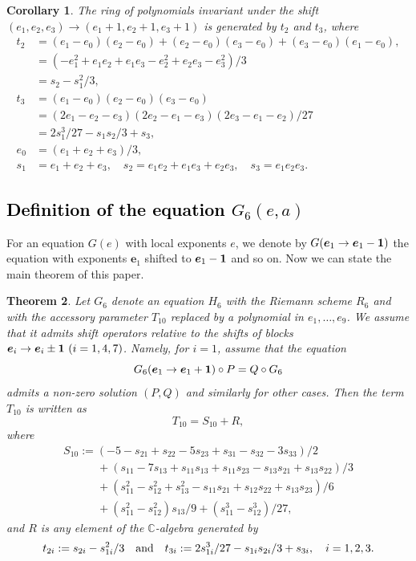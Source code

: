 \documentclass[a4paper,12pt]{article}
\newtheorem{thm}{Theorem}[section]  %
\newtheorem{cor}[thm]{Corollary}
\theoremstyle{definition}
\theoremstyle{remark}
\numberwithin{equation}{section} %
\newcommand{\blue}[1]{\textcolor{black}{#1}}
\begin{document}
\begin{cor}\label{t2t3}The ring of polynomials invariant under the shift $(e_1,e_2,e_3)\to(e_1+1,e_2+1,e_3+1)$ is generated by $t_2$ and $t_3$, where
\[
\begin{array}{ll}
    t_2&=(e_1-e_0)(e_2-e_0)+(e_2-e_0)(e_3-e_0)+(e_3-e_0)(e_1-e_0),\\
    &=(-e_1^2 + e_1e_2 + e_1e_3 - e_2^2 + e_2e_3 - e_3^2)/3\\
    &=s_2-s_1^2/3,\\[2mm]
    t_3&=(e_1 - e_0)(e_2 - e_0)(e_3 - e_0)\\
    &=(2e_1 - e_2 - e_3)(2e_2 - e_1 - e_3)(2e_3 - e_1 - e_2)/27\\
    &=2s_1^3/27 - s_1s_2/3 + s_3,    \\
    e_0&=(e_1+e_2+e_3)/3, \\
    s_1&=e_1+e_2+e_3, \quad s_2=e_1e_2+e_1e_3+e_2e_3, \quad s_3=e_1e_2e_3.
  \end{array}
\]
\end{cor}

\subsection{\blue{Definition of the equation $G_6(e,a)$}}\label{theoremG5}
For an equation $G(e)$ with local exponents $e$, we denote
by $G({\bm e}_1\to{\bm e}_1-{\bf 1})$ the equation with exponents
${\bm e}_1$ shifted to ${\bm e}_1-{\bf 1}$ and so on.
Now we can state the main theorem of this paper.

\begin{thm}\label{shiftopG6} Let $G_6$ denote an equation $H_6$ 
with the Riemann scheme $R_6$ and with the accessory parameter $T_{10}$ 
 replaced by a polynomial 
in $e_1,\dots,e_9$. We assume that it admits shift operators relative 
to the shifts of blocks ${\bm e}_i\to{\bm e}_i\pm{\bf 1}\ (i=1, 4, 7)$. 
Namely, for $i=1$, assume that the equation
  \[G_6({\bm e}_1\to {\bm e}_1+{\bf 1})\circ P= Q\circ G_6\]
admits a non-zero solution $(P,Q)$ and similarly for other cases. Then
the term $T_{10}$ is written as
\[T_{10}=S_{10}+R,\]
  where
\[
\begin{array}{l}
  S_{10}:=(-5-s_{21}+s_{22}-5s_{23}+s_{31}-s_{32}-3s_{33})/2 \\[2mm]
\quad\qquad +(s_{11}-7s_{13}+s_{11}s_{13}+s_{11}s_{23}-s_{13}s_{21}+s_{13}s_{22})/3\\[2mm]
\quad\qquad  +(s_{11}^2-s_{12}^2+s_{13}^2-s_{11}s_{21}+s_{12}s_{22}+s_{13}s_{23})/6\\[2mm]
\quad\qquad  +(s_{11}^2-s_{12}^2)s_{13}/9+(s_{11}^3-s_{12}^3)/27,
  \end{array}
\]
and $R$ is any element of the $\mathbb{C}$-algebra generated by
\[t_{2i}:=s_{2i}-s_{1i}^2/3 {\rm\quad and\quad } 
t_{3i}:=2s_{1i}^3/27 - s_{1i}s_{2i}/3 + s_{3i},\quad i=1,2,3.
\]
\end{thm}
\end{document}
